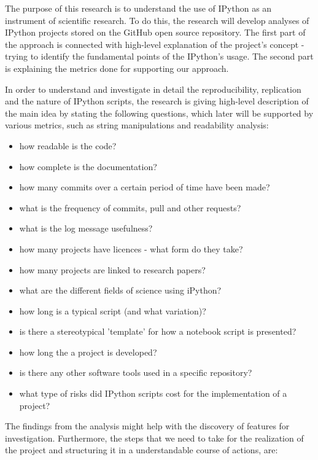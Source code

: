 
The purpose of this research is to understand the use of IPython as an instrument of scientific research.  To do this, the research will develop analyses of IPython projects stored on the GitHub open source repository. The first part of the approach is connected with high-level explanation of the project's concept - trying to identify the fundamental points of the IPython's usage. The second part is explaining the metrics done for supporting our approach.

In order to understand and investigate in detail the reproducibility, replication and the nature of IPython scripts, the research is giving high-level description of the main idea by stating the following questions, which later will be supported by various metrics, such as string manipulations and readability analysis:

\begin{itemize}
\item how readable is the code?
\item how complete is the documentation?
\item how many commits over a certain period of time have been made?
\item what is the frequency of commits, pull and other requests?
\item what is the log message usefulness?
\item how many projects have licences - what form do they take?
\item how many projects are linked to research papers?
\item what are the different fields of science using iPython?
\item how long is a typical script (and what variation)?
\item is there a stereotypical 'template' for how a notebook script is presented?
\item how long the a project is developed?
\item is there any other software tools used in a specific repository? 
\item what type of risks did IPython scripts cost for the implementation of a project? 

\end{itemize}

The findings from the analysis might help with the discovery of features for investigation. Furthermore, the steps that we need to take for the realization of the project and structuring it in a understandable course of actions, are:


